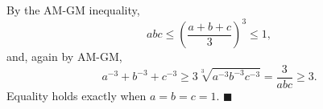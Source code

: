 By the AM-GM inequality,
\[abc\le\left(\dfrac{a+b+c}{3}\right)^3\le1,\]
and, again by AM-GM,
\[a^{-3}+b^{-3}+c^{-3}\ge3\sqrt[3]{a^{-3}b^{-3}c^{-3}}=\dfrac{3}{abc}\ge3.\]
Equality holds exactly when $a=b=c=1$. $\blacksquare$
